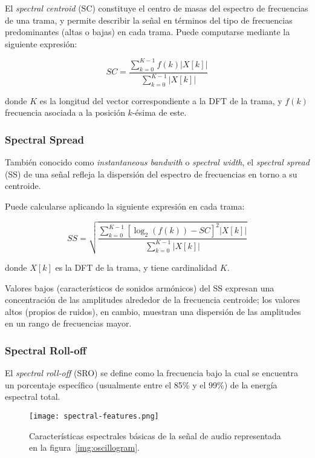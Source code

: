 El \textit{spectral centroid} (SC) constituye el centro de masas del espectro de frecuencias de una trama, y permite describir la señal en términos del tipo de frecuencias predominantes (altas o bajas) en cada trama.
Puede computarse mediante la siguiente expresión:

\begin{equation}
    \label{eq:SC}
    SC = \frac{\sum_{k=0}^{K-1}{f(k)|X[k]|}}{\sum_{k=0}^{K-1}{|X[k]|}}
\end{equation}

\noindent
donde $K$ es la longitud del vector correspondiente a la DFT de la trama, y $f(k)$ frecuencia asociada a la posición $k$-ésima de este.

\subsubsection{Spectral Spread}

También conocido como \textit{instantaneous bandwith} o \textit{spectral width}, el \textit{spectral spread} (SS) de una señal refleja la dispersión del espectro de frecuencias en torno a su centroide.

Puede calcularse aplicando la siguiente expresión en cada trama:

\begin{equation}
    \label{eq:SS}
    SS = \sqrt{\frac{\sum_{k=0}^{K-1}{\left[ \log_{2}{(f(k))-SC} \right]^2 |X[k]|}}{\sum_{k=0}^{K-1}{|X[k]|}}}
\end{equation}

\noindent
donde $X[k]$ es la DFT de la trama, y tiene cardinalidad $K$.

Valores bajos (característicos de sonidos armónicos) del SS expresan una concentración de las amplitudes alrededor de la frecuencia centroide;
los valores altos (propios de ruidos), en cambio, muestran una dispersión de las amplitudes en un rango de frecuencias mayor.

\subsubsection{Spectral Roll-off}

El \textit{spectral roll-off} (SRO) se define como la frecuencia bajo la cual se encuentra un porcentaje específico (usualmente entre el 85\% y el 99\%) de la energía espectral total.

\begin{figure}[!h]
    \centering
    \texttt{[image: spectral-features.png]}
    \caption{Características espectrales básicas de la señal de audio representada en la figura~\ref{img:oscillogram}.}
    \label{img:basic-spectral-descriptors}
\end{figure}

